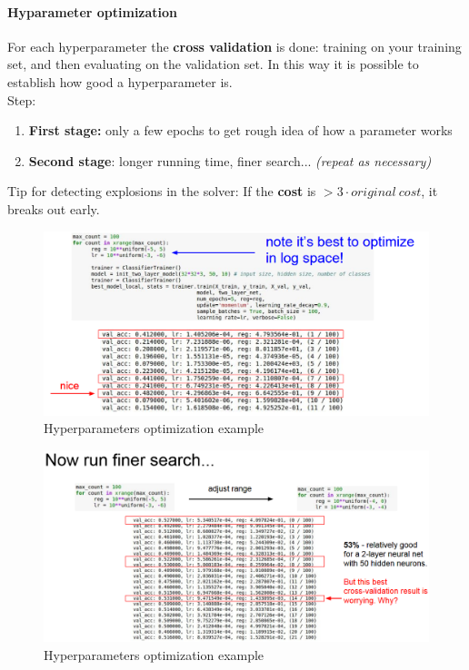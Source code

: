 \documentclass[11pt]{article}
\begin{document}
\paragraph{Hyparameter optimization}
For each hyperparameter the \textbf{cross validation} is done: training on your training set, and then evaluating on the validation set. In this way it is possible to establish how good a hyperparameter is.\\
Step:
\begin{enumerate}
    \item \textbf{First stage:} only a few epochs to get rough idea of how a parameter works
    \item \textbf{Second stage}: longer running time, finer search... \textit{(repeat as necessary)}
\end{enumerate}{}
Tip for detecting explosions in the solver: If the \textbf{cost} is $ > 3 \cdot original \ cost$, it breaks out early.
\begin{figure}[h]
\centering
\captionsetup{justification=centering}
\includegraphics[width=0.9\linewidth]{L511.pdf}
\caption{ Hyperparameters optimization example}
\label{fig:L511}
\end{figure}
\begin{figure}[h]
\centering
\captionsetup{justification=centering}
\includegraphics[width=0.9\linewidth]{L512.pdf}
\caption{ Hyperparameters optimization example}
\label{fig:L512}
\end{figure}\\
\end{document}
